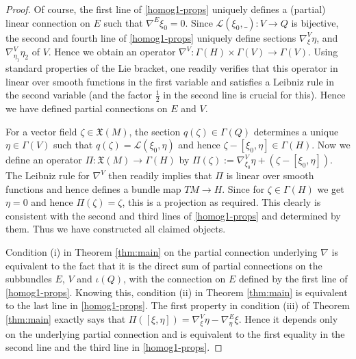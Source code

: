 \documentclass[11pt]{amsart}
\numberwithin{proposition}{section}
\numberwithin{equation}{section}
\begin{document}
\begin{proof}
Of course, the first line of \eqref{homog1-props} uniquely defines a (partial) linear connection on $E$ such that $\nabla^E\xi_0=0$. Since $\mathcal L(\xi_0,\_):V\to Q$ is bijective, the second and fourth line of \eqref{homog1-props} uniquely define sections $\nabla^V_\xi\eta$, and $\nabla^V_{\eta_1}\eta_2$ of $V$. Hence we obtain an operator $\nabla^V:\Gamma(H)\times\Gamma(V)\to\Gamma(V)$. Using standard properties of the Lie bracket, one readily verifies that this operator in linear over smooth functions in the first variable and satisfies a Leibniz rule in the second variable (and the factor $\tfrac12$ in the second line is crucial for this). Hence we have defined partial connections on $E$ and $V$. 

For a vector field $\zeta\in\mathfrak X(M)$, the section $q(\zeta)\in\Gamma(Q)$ determines a unique $\eta\in\Gamma(V)$ such that $q(\zeta)=\mathcal L(\xi_0,\eta)$ and hence $\zeta-[\xi_0,\eta]\in\Gamma(H)$. Now we define an operator $\Pi:\mathfrak X(M)\to\Gamma(H)$ by $\Pi(\zeta):=\nabla^V_{\xi_0}\eta+(\zeta-[\xi_0,\eta])$. The Leibniz rule for $\nabla^V$ then readily implies that $\Pi$ is linear over smooth functions and hence defines a bundle map $TM\to H$. Since for $\zeta\in\Gamma(H)$ we get $\eta=0$ and hence $\Pi(\zeta)=\zeta$, this is a projection as required. This clearly is consistent with the second and third lines of \eqref{homog1-props} and determined by them. Thus we have constructed all claimed objects. 

Condition (i) in Theorem \ref{thm:main} on the partial connection underlying $\nabla$ is equivalent to the fact that it is the direct sum of partial connections on the subbundles $E$, $V$ and $\iota(Q)$, with the connection on $E$ defined by the first line of \eqref{homog1-props}. Knowing this, condition (ii) in Theorem \ref{thm:main} is equivalent to the last line in \eqref{homog1-props}. The first property in condition (iii) of Theorem \ref{thm:main} exactly says that $\Pi([\xi,\eta])=\nabla^V_\xi\eta-\nabla^E_\eta\xi$. Hence it depends only on the underlying partial connection and is equivalent to the first equality in the second line and the third line in \eqref{homog1-props}. 


\end{proof}
\end{document}
